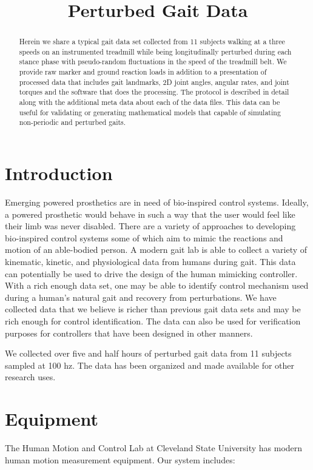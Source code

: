 \documentclass{article}
\title{Perturbed Gait Data}
\begin{document}
\begin{abstract}

  Herein we share a typical gait data set collected from 11 subjects walking at
  a three speeds on an instrumented treadmill while being longitudinally
  perturbed during each stance phase with pseudo-random fluctuations in the
  speed of the treadmill belt. We provide raw marker and ground reaction loads in addition
  to a presentation of processed data that includes gait landmarks, 2D joint
  angles, angular rates, and joint torques and the software that does the
  processing. The protocol is described in detail along with the additional
  meta data about each of the data files. This data can be useful for
  validating or generating mathematical models that capable of simulating
  non-periodic and perturbed gaits.

\end{abstract}

\section{Introduction}
%
Emerging powered prosthetics are in need of bio-inspired control systems.
Ideally, a powered prosthetic would behave in such a way that the user would
feel like their limb was never disabled. There are a variety of approaches to
developing bio-inspired control systems some of which aim to mimic the
reactions and motion of an able-bodied person. A modern gait lab is able to
collect a variety of kinematic, kinetic, and physiological data from humans
during gait. This data can potentially be used to drive the design of the human
mimicking controller. With a rich enough data set, one may be able to identify
control mechanism used during a human's natural gait and recovery from
perturbations. We have collected data that we believe is richer than previous
gait data sets and may be rich enough for control identification. The data can
also be used for verification purposes for controllers that have been designed
in other manners.

We collected over five and half hours of perturbed gait data from 11 subjects
sampled at 100 hz. The data has been organized and made available for other
research uses.

\section{Equipment}
%
The Human Motion and Control Lab at Cleveland State University has modern human
motion measurement equipment. Our system includes:
\end{document}

